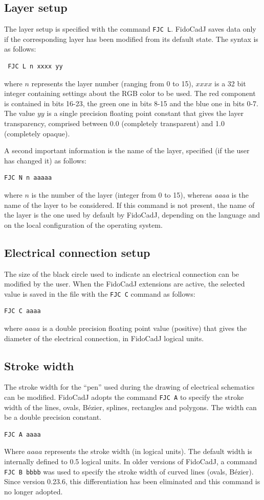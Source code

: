 \documentclass[10pt,a4paper,twoside]{scrreprt}
\begin{document}
 \subsection{Layer setup}
 The layer setup is specified with the command \lstinline!FJC L!. FidoCadJ saves data only if the corresponding layer has been modified from its default state. The syntax is as follows:
 \begin{lstlisting}
 FJC L n xxxx yy
\end{lstlisting}
where $n$ represents the layer number (ranging from 0 to 15), $xxxx$ is a 32 bit integer containing settings about the RGB color to be used. The red component is contained in bits 16-23, the green one in bits 8-15 and the blue one in bits 0-7.
The value $yy$ is a single precision floating point constant that gives the layer transparency, comprised between 0.0 (completely transparent) and 1.0 (completely opaque).

A second important information is the name of the layer, specified (if the user has changed it) as follows:
\begin{lstlisting}
FJC N n aaaaa
\end{lstlisting}
where $n$ is the number of the layer (integer from 0 to 15), whereas {\normalfont \itshape aaaa} is the name of the layer to be considered. If this command is not present, the name of the layer is the one used by default by FidoCadJ, depending on the language and on the local configuration of the operating system.

\subsection{Electrical connection setup}
The size of the black circle used to indicate an electrical connection can be modified by the user.
When the FidoCadJ extensions are active, the selected value is saved in the file with the \lstinline!FJC C! command as follows:
\begin{lstlisting}
FJC C aaaa
\end{lstlisting}
where $aaaa$ is a double precision floating point value (positive) that gives the diameter of the electrical connection, in FidoCadJ logical units.

 \subsection{Stroke width}
 The stroke width for the ``pen'' used during the drawing of electrical schematics can be modified. FidoCadJ adopts the command \lstinline!FJC A! to specify the stroke width of the lines, ovals, B\'ezier, splines, rectangles and polygons. The width can be a double precision constant.
\begin{lstlisting}
FJC A aaaa
\end{lstlisting}
Where $aaaa$ represents the stroke width (in logical units). The default width is internally defined to 0.5 logical units. In older versions of FidoCadJ, a command \lstinline!FJC B bbbb! was used to specify the stroke width of curved lines (ovals, B\'ezier). Since version 0.23.6, this differentiation has been eliminated and this command is no longer adopted.
\end{document}
